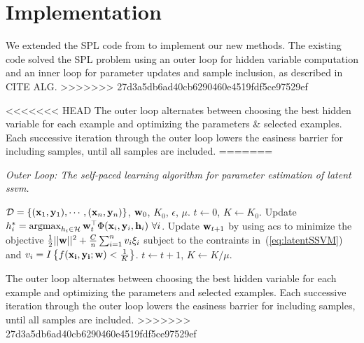 \documentclass{article}
\newcommand{\mysection}[1]{\vspace{-4mm}\section{#1}\vspace{-4mm}}
\newcommand{\mytopcaption}[1]{\caption{\em \footnotesize #1}}
\newcommand{\argmax}{\operatornamewithlimits{argmax}}
\begin{document}
\mysection{Implementation}
\label{sec:Implementation}

We extended the SPL code from \cite{SPL} to implement our new methods. The existing code solved the SPL problem using an outer loop for hidden variable computation and an inner loop for parameter updates and sample inclusion, as described in CITE ALG.
>>>>>>> 27d3a5db6ad40cb6290460e4519fdf5ce97529ef


<<<<<<< HEAD
The outer loop alternates between choosing the best hidden variable for each example and optimizing the parameters \& selected examples.  Each successive iteration through the outer loop lowers the easiness barrier for including samples, until all samples are included.
=======
\begin{algorithm}[h!]
\mytopcaption{Outer Loop: The self-paced learning algorithm for parameter estimation of latent {\sc ssvm}.}
\label{algo:selfPacedLatentSSVM}
\begin{algorithmic}[1]
\INPUT ${\cal D} = \{({\bf x}_1,{\bf y}_1),\cdots,({\bf x}_n,{\bf y}_n)\}$, ${\bf w}_0$, $K_0$, $\epsilon$, $\mu$.
\STATE $t \leftarrow 0$, $K \leftarrow K_0$.
\REPEAT
\STATE Update $h_i^* = \argmax_{h_i \in {\cal H}} {\bf w}_{t}^\top \Phi({\bf x}_i,{\bf y}_i,{\bf h}_i)\ \forall i$.
\STATE Update ${\bf w}_{t+1}$ by using {\sc acs} to minimize the objective
$\frac{1}{2}||{\bf w}||^2 + \frac{C}{n} \sum_{i=1}^n v_i\xi_i$ subject to the contraints in~(\ref{eq:latentSSVM}) and $v_i=I\left\{f({\bf x_i,\bf y_i;\bf w}) < \frac{1}{K}\right\}$.
\STATE $t \leftarrow t + 1$, $K \leftarrow K/\mu$.
\end{algorithmic}
\end{algorithm}

The outer loop alternates between choosing the best hidden variable for each example and optimizing the parameters and selected examples.  Each successive iteration through the outer loop lowers the easiness barrier for including samples, until all samples are included.
>>>>>>> 27d3a5db6ad40cb6290460e4519fdf5ce97529ef
\end{document}
